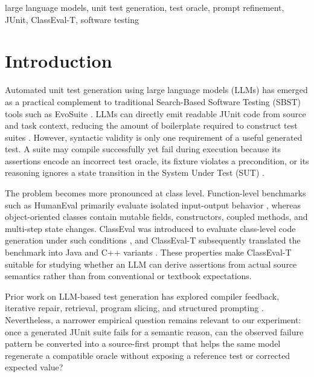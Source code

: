 \documentclass[conference]{IEEEtran}
\begin{document}
\begin{IEEEkeywords}
large language models, unit test generation, test oracle, prompt refinement, JUnit, ClassEval-T, software testing
\end{IEEEkeywords}

\section{Introduction}
Automated unit test generation using large language models (LLMs) has emerged as a practical complement to traditional Search-Based Software Testing (SBST) tools such as EvoSuite \cite{fraser2011evosuite}. LLMs can directly emit readable JUnit code from source and task context, reducing the amount of boilerplate required to construct test suites \cite{schafer2024empirical,siddiq2024junit,alshahwan2024meta}. However, syntactic validity is only one requirement of a useful generated test. A suite may compile successfully yet fail during execution because its assertions encode an incorrect test oracle, its fixture violates a precondition, or its reasoning ignores a state transition in the System Under Test (SUT) \cite{yuan2024chattester,gu2024testart,konstantinou2025yate}.

The problem becomes more pronounced at class level. Function-level benchmarks such as HumanEval primarily evaluate isolated input-output behavior \cite{chen2021humaneval}, whereas object-oriented classes contain mutable fields, constructors, coupled methods, and multi-step state changes. ClassEval was introduced to evaluate class-level code generation under such conditions \cite{du2024classeval}, and ClassEval-T subsequently translated the benchmark into Java and C++ variants \cite{xue2025classevalt}. These properties make ClassEval-T suitable for studying whether an LLM can derive assertions from actual source semantics rather than from conventional or textbook expectations.

Prior work on LLM-based test generation has explored compiler feedback, iterative repair, retrieval, program slicing, and structured prompting \cite{yuan2024chattester,gu2024testart,wang2024hits,ryan2024codeaware}. Nevertheless, a narrower empirical question remains relevant to our experiment: once a generated JUnit suite fails for a semantic reason, can the observed failure pattern be converted into a source-first prompt that helps the same model regenerate a compatible oracle without exposing a reference test or corrected expected value?
\end{document}
